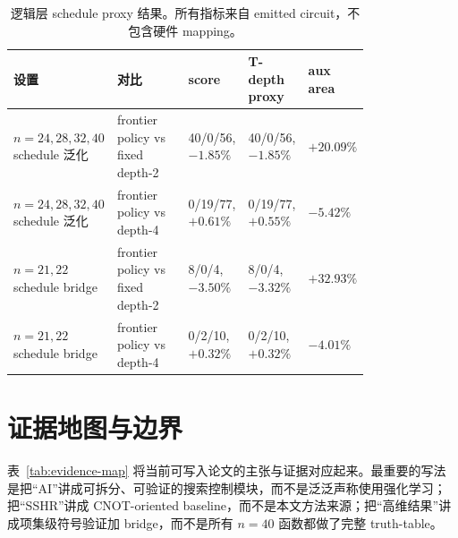 \documentclass[UTF8,fontset=macnew,11pt]{ctexart}
\newcommand{\ttable}{truth-table}
\begin{document}
\begin{table}[H]
\centering
\tiny
\caption{逻辑层 schedule proxy 结果。所有指标来自 emitted circuit，不包含硬件 mapping。}
\label{tab:schedule}
\begin{tabular}{@{}p{0.20\linewidth}p{0.20\linewidth}p{0.14\linewidth}p{0.15\linewidth}p{0.10\linewidth}@{}}
\toprule
设置 & 对比 & score & T-depth proxy & aux area \\
\midrule
$n=24,28,32,40$ schedule 泛化 & frontier policy vs fixed depth-2 & 40/0/56, $-1.85\%$ & 40/0/56, $-1.85\%$ & $+20.09\%$ \\
$n=24,28,32,40$ schedule 泛化 & frontier policy vs depth-4 & 0/19/77, $+0.61\%$ & 0/19/77, $+0.55\%$ & $-5.42\%$ \\
$n=21,22$ schedule bridge & frontier policy vs fixed depth-2 & 8/0/4, $-3.50\%$ & 8/0/4, $-3.32\%$ & $+32.93\%$ \\
$n=21,22$ schedule bridge & frontier policy vs depth-4 & 0/2/10, $+0.32\%$ & 0/2/10, $+0.32\%$ & $-4.01\%$ \\
\bottomrule
\end{tabular}
\end{table}

\section{证据地图与边界}

表~\ref{tab:evidence-map} 将当前可写入论文的主张与证据对应起来。最重要的写法是把“AI”讲成可拆分、可验证的搜索控制模块，而不是泛泛声称使用强化学习；把“SSHR”讲成 CNOT-oriented baseline，而不是本文方法来源；把“高维结果”讲成项集级符号验证加 bridge，而不是所有 $n=40$ 函数都做了完整 \ttable{}。
\end{document}
